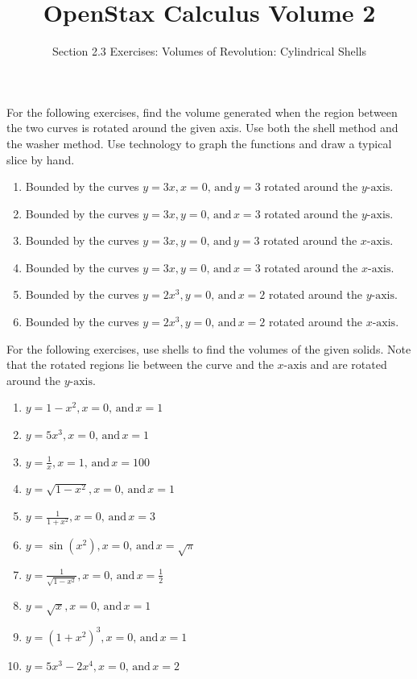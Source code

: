 \documentclass{exercises}
\title{OpenStax Calculus Volume 2}
\subtitle{Section 2.3 Exercises: Volumes of Revolution: Cylindrical Shells}
\author{}
\date{}
\begin{document}
\maketitle


For the following exercises, find the volume generated when the region between the two curves is rotated around the given axis. Use both the shell method and the washer method. Use technology to graph the functions and draw a typical slice by hand.

\begin{enumerate}[start=1]
\item \techrequired Bounded by the curves $y=3x,x=0,\,\text{and}\,y=3$ rotated around the $y\text{-axis}$.
\item \techrequired Bounded by the curves $y=3x,y=0,\,\text{and}\,x=3$ rotated around the $y\text{-axis}$.
\item \techrequired Bounded by the curves $y=3x,y=0,\,\text{and}\,y=3$ rotated around the $x\text{-axis}$.
\item \techrequired Bounded by the curves $y=3x,y=0,\,\text{and}\,x=3$ rotated around the $x\text{-axis}$.
\item \techrequired Bounded by the curves $y=2x^{3},y=0,\,\text{and}\,x=2$ rotated around the $y\text{-axis}$.
\item \techrequired Bounded by the curves $y=2x^{3},y=0,\,\text{and}\,x=2$ rotated around the $x\text{-axis}$.
\end{enumerate}

For the following exercises, use shells to find the volumes of the given solids. Note that the rotated regions lie between the curve and the $x\text{-axis}$ and are rotated around the $y\text{-axis}$.

\begin{enumerate}[resume]
\item $y=1-x^{2},x=0,\,\text{and}\,x=1$
\item $y=5x^{3},x=0,\,\text{and}\,x=1$
\item $y=\frac{1}{x},x=1,\,\text{and}\,x=100$
\item $y=\sqrt{1-x^{2}},x=0,\,\text{and}\,x=1$
\item $y=\frac{1}{1+x^{2}},x=0,\,\text{and}\,x=3$
\item $y=\sin(x^{2}),x=0,\,\text{and}\,x=\sqrt{\pi}$
\item $y=\frac{1}{\sqrt{1-x^{2}}},x=0,\,\text{and}\,x=\frac{1}{2}$
\item $y=\sqrt{x},x=0,\,\text{and}\,x=1$
\item $y=(1+x^{2})^{3},x=0,\,\text{and}\,x=1$
\item $y=5x^{3}-2x^{4},x=0,\,\text{and}\,x=2$
\end{enumerate}
\end{document}
